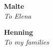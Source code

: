 \cleardoublepage\newpage\thispagestyle{empty}\null
\cleardoublepage\newpage

\thispagestyle{empty}

\hspace{0pt}
\vfill

\begin{center}
\large

\textbf{Malte}\\
\medskip
\textit{To Elena}

\vspace*{2cm}

\textbf{Henning}\\
\medskip
\textit{To my families}


\end{center} 

\vfill
\hspace{0pt}
\vfill
\hspace{0pt}

\setlength{\abovedisplayskip}{-5pt}
\setlength{\abovedisplayshortskip}{-5pt}

\cleardoublepage
